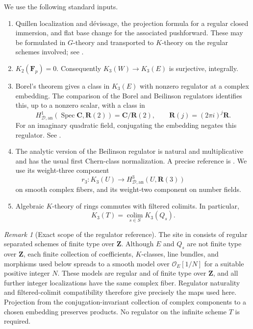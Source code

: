 \documentclass[11pt,a4paper]{article}
\theoremstyle{remark}
\newtheorem{remark}[theorem]{Remark}
\newcommand{\Z}{\mathbf Z}
\newcommand{\R}{\mathbf R}
\newcommand{\C}{\mathbf C}
\newcommand{\F}{\mathbf F}
\newcommand{\OO}{\mathcal O}
\newcommand{\Spec}{\operatorname{Spec}}
\newcommand{\colim}{\operatorname*{colim}}
\newcommand{\HD}{H_{\mathcal D,\mathrm{an}}}
\begin{document}
We use the following standard inputs.

\begin{enumerate}
\item Quillen localization and d\'evissage, the projection formula for a regular closed immersion, and flat base change for the associated pushforward. These may be formulated in $G$-theory and transported to $K$-theory on the regular schemes involved; see \cite{Quillen}.
\item $K_2(\F_p)=0$. Consequently $K_3(W)\to K_3(E)$ is surjective, integrally.
\item Borel's theorem gives a class in $K_3(E)$ with nonzero regulator at a complex embedding. The comparison of the Borel and Beilinson regulators identifies this, up to a nonzero scalar, with a class in
\[
\HD^1(\Spec\C,\R(2))=\C/\R(2),\qquad \R(j)=(2\pi i)^j\R.
\]
For an imaginary quadratic field, conjugating the embedding negates this regulator. See \cite{Borel,BunkeTamme}.
\item The analytic version of the Beilinson regulator is natural and multiplicative and has the usual first Chern-class normalization. A precise reference is \cite[Theorem~2.31]{BunkeTamme}. We use its weight-three component
\[
r_3:K_3(U)\longrightarrow\HD^3(U,\R(3))
\]
on smooth complex fibers, and its weight-two component on number fields.
\item Algebraic $K$-theory of rings commutes with filtered colimits. In particular,
\begin{equation}\label{eq:continuity}
K_3(T)=\colim_{s\in S} K_3(Q_s).
\end{equation}
\end{enumerate}

\begin{remark}[Exact scope of the regulator reference]\label{rem:spreading}
The site in \cite{BunkeTamme} consists of regular separated schemes of finite type over $\Z$. Although $E$ and $Q_s$ are not finite type over $\Z$, each finite collection of coefficients, $K$-classes, line bundles, and morphisms used below spreads to a smooth model over $\OO_E[1/N]$ for a suitable positive integer $N$. These models are regular and of finite type over $\Z$, and all further integer localizations have the same complex fiber. Regulator naturality and filtered-colimit compatibility therefore give precisely the maps used here. Projection from the conjugation-invariant collection of complex components to a chosen embedding preserves products. No regulator on the infinite scheme $T$ is required.
\end{remark}
\end{document}
